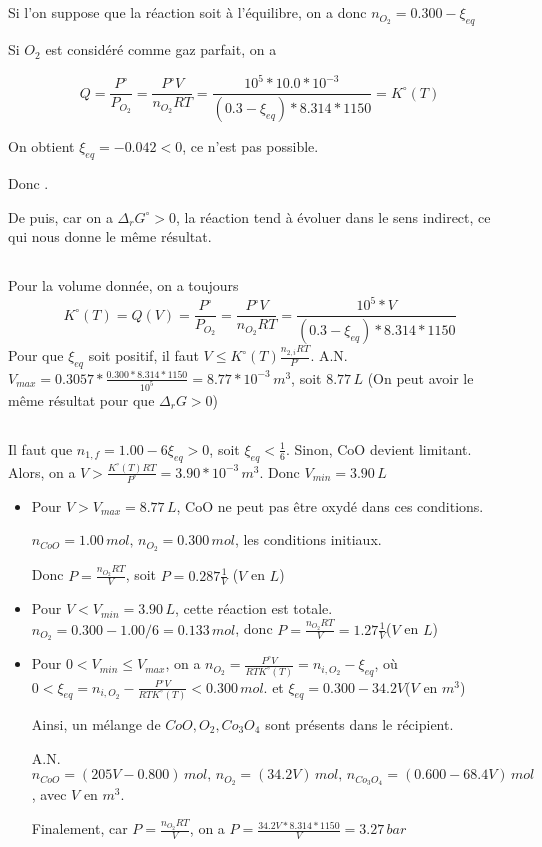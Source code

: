 \documentclass[a4paper,12pt]{book}
\begin{document}
\subsection{}
Si l'on suppose que la réaction soit à l'équilibre, on a donc $n_{O_2}=0.300-\xi_{eq}$

Si $O_2$ est considéré comme gaz parfait, on a 

$$Q=\frac{P^\circ}{P_{O_2}}=\frac{P^\circ V}{n_{O_2}RT}=\frac{10^5*10.0*10^{-3}}{(0.3-\xi_{eq})*8.314*1150}=K^\circ(T)$$

On obtient $\xi_{eq}=-0.042<0$, ce n'est pas possible.  

Donc . 

De puis, car on a $\Delta_rG^\circ>0$, la réaction tend à évoluer dans le sens indirect, ce qui nous donne le même résultat. 
\subsection{}
Pour la volume donnée, on a toujours 
$$
K^\circ(T)=Q(V)=\frac{P^\circ}{P_{O_2}}=\frac{P^\circ V}{n_{O_2}RT}=\frac{10^5*V}{(0.3-\xi_{eq})*8.314*1150}
$$
Pour que $\xi_{eq}$ soit positif, il faut $\boxed{V\leq K^\circ(T)\frac{n_{2,i}RT}{P^\circ}}$. A.N. $V_{max}=0.3057*\frac{0.300*8.314*1150}{10^5}=8.77*10^{-3}\,m^3$, soit $\boxed{8.77 \,L}$
(On peut avoir le même résultat pour que $\Delta_rG>0$)
\subsection{}
Il faut que $n_{1,f}=1.00-6\xi_{eq}>0$, soit $\xi_{eq}<\frac{1}{6}$. Sinon, CoO devient limitant. Alors, on a $V>\frac{K^\circ(T)RT}{P^\circ}=3.90*10^{-3}\,m^3$. Donc $V_{min}=3.90\,L$ 

\begin{itemize}
    \item Pour $V>V_{max}=8.77\,L$, CoO ne peut pas être oxydé dans ces conditions. 
    
    $\boxed{n_{CoO}=1.00\,mol,\,n_{O_2}=0.300\,mol}$, les conditions initiaux. 
    
    Donc $P=\frac{n_{O_2}RT}{V}$, soit $\boxed{P=0.287\frac{1}{V}}$ ($V$ en $L$)
    \item Pour $V<V_{min}=3.90\,L$, cette réaction est totale. $n_{O_2}=0.300-1.00/6=0.133\,mol$, donc $\boxed{P=\frac{n_{O_2}RT}{V}=1.27\frac{1}{V}}$($V$ en $L$)
    
    \item Pour $0<V_{min}\leq V_{max}$, on a $n_{O_2}=\frac{P^\circ V}{RTK^\circ(T)}=n_{i,O_2}-\xi_{eq}$, où $0<\xi_{eq}=n_{i,O_2}-\frac{P^\circ V}{RTK^\circ(T)}<0.300\,mol$. 
    et $\xi_{eq}=0.300-34.2V$($V$ en $m^3$)

    Ainsi, un mélange de $CoO,O_2,Co_3O_4$ sont présents dans le récipient.
    
    A.N. $\boxed{n_{CoO}=(205V-0.800)\,mol,\,n_{O_2}=(34.2V)\,mol,\,n_{Co_3O_4}=(0.600-68.4V)\,mol}$, avec $V$ en $m^3$. 

    Finalement, car $P=\frac{n_{O_2}RT}{V}$, on a $\boxed{P=\frac{34.2V*8.314*1150}{V}=3.27\,bar}$
\end{itemize}
\end{document}
